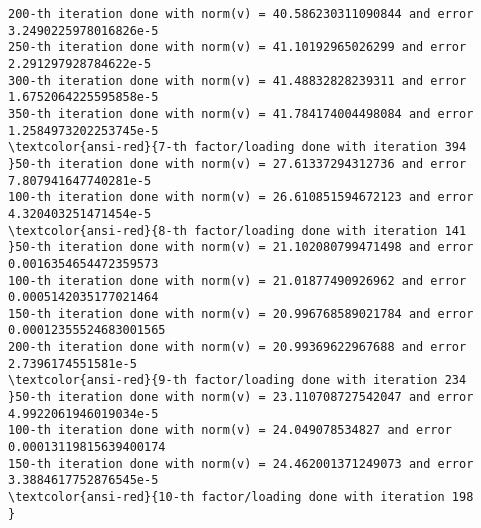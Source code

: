 \documentclass[11pt]{article}
\begin{document}
\begin{Verbatim}[commandchars=\\\{\}]
200-th iteration done with norm(v) = 40.586230311090844 and error 3.2490225978016826e-5
250-th iteration done with norm(v) = 41.10192965026299 and error 2.291297928784622e-5
300-th iteration done with norm(v) = 41.48832828239311 and error 1.6752064225595858e-5
350-th iteration done with norm(v) = 41.784174004498084 and error 1.2584973202253745e-5
\textcolor{ansi-red}{7-th factor/loading done with iteration 394
}50-th iteration done with norm(v) = 27.61337294312736 and error 7.807941647740281e-5
100-th iteration done with norm(v) = 26.610851594672123 and error 4.320403251471454e-5
\textcolor{ansi-red}{8-th factor/loading done with iteration 141
}50-th iteration done with norm(v) = 21.102080799471498 and error 0.0016354654472359573
100-th iteration done with norm(v) = 21.01877490926962 and error 0.0005142035177021464
150-th iteration done with norm(v) = 20.996768589021784 and error 0.00012355524683001565
200-th iteration done with norm(v) = 20.99369622967688 and error 2.7396174551581e-5
\textcolor{ansi-red}{9-th factor/loading done with iteration 234
}50-th iteration done with norm(v) = 23.110708727542047 and error 4.9922061946019034e-5
100-th iteration done with norm(v) = 24.049078534827 and error 0.00013119815639400174
150-th iteration done with norm(v) = 24.462001371249073 and error 3.3884617752876545e-5
\textcolor{ansi-red}{10-th factor/loading done with iteration 198
}
    \end{Verbatim}
\end{document}
